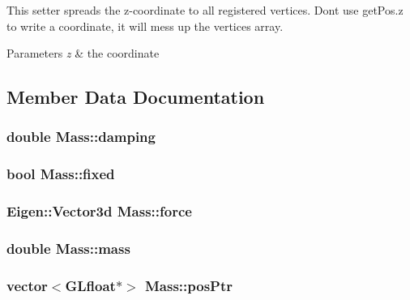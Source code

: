 This setter spreads the z-\/coordinate to all registered vertices. Don\textquotesingle{}t use get\+Pos.\+z to write a coordinate, it will mess up the vertices array. 
\begin{DoxyParams}{Parameters}
{\em z} & the coordinate \\
\hline
\end{DoxyParams}


\subsection{Member Data Documentation}
\hypertarget{classMass_a3b1f3a41fdfc00900a242df309c9c77f}{}
\subsubsection[{damping}]{\setlength{\rightskip}{0pt plus 5cm}double Mass\+::damping}\label{classMass_a3b1f3a41fdfc00900a242df309c9c77f}
\hypertarget{classMass_a596327e28cfa013455a6cd00ca25353e}{}
\subsubsection[{fixed}]{\setlength{\rightskip}{0pt plus 5cm}bool Mass\+::fixed}\label{classMass_a596327e28cfa013455a6cd00ca25353e}
\hypertarget{classMass_a5afb4b915d143d4a5156eb7e7e035012}{}
\subsubsection[{force}]{\setlength{\rightskip}{0pt plus 5cm}Eigen\+::\+Vector3d Mass\+::force\hspace{0.3cm}{\ttfamily [private]}}\label{classMass_a5afb4b915d143d4a5156eb7e7e035012}
\hypertarget{classMass_a8f37b93ded277000424b7a92adcf9c30}{}
\subsubsection[{mass}]{\setlength{\rightskip}{0pt plus 5cm}double Mass\+::mass}\label{classMass_a8f37b93ded277000424b7a92adcf9c30}
\hypertarget{classMass_abfd5e8aa50988458d702763a48cb438e}{}
\subsubsection[{pos\+Ptr}]{\setlength{\rightskip}{0pt plus 5cm}vector$<$G\+Lfloat$\ast$$>$ Mass\+::pos\+Ptr\hspace{0.3cm}{\ttfamily [private]}}\label{classMass_abfd5e8aa50988458d702763a48cb438e}
\hypertarget{classMass_a2e7622d21617bdbf3939ee2ec5784b6d}{}
